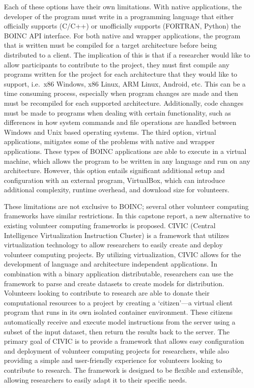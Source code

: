 \documentclass[11pt]{article}
\begin{document}
Each of these options have their own limitations. With native applications, the developer of the program must write in a programming language that either officially supports (C/C++) or unofficially supports (FORTRAN, Python) the BOINC API interface. For both native and wrapper applications, the program that is written must be compiled for a target architecture before being distributed to a client. The implication of this is that if a researcher would like to allow participants to contribute to the project, they must first compile any programs written for the project for each architecture that they would like to support, i.e.\ x86 Windows, x86 Linux, ARM Linux, Android, etc. This can be a time consuming process, especially when program changes are made and then must be recompiled for each supported architecture. Additionally, code changes must be made to programs when dealing with certain functionality, such as differences in how system commands and file operations are handled between Windows and Unix based operating systems. The third option, virtual applications, mitigates some of the problems with native and wrapper applications. These types of BOINC applications are able to execute in a virtual machine, which allows the program to be written in any language and run on any architecture. However, this option entails significant additional setup and configuration with an external program, VirtualBox, which can introduce additional complexity, runtime overhead, and download size for volunteers.

These limitations are not exclusive to BOINC; several other volunteer computing frameworks have similar restrictions. In this capstone report, a new alternative to existing volunteer computing frameworks is proposed. CIVIC (Central Intelligence Virtualization Instruction Cluster) is a framework that utilizes virtualization technology to allow researchers to easily create and deploy volunteer computing projects. By utilizing virtualization, CIVIC allows for the development of language and architecture independent applications. In combination with a binary application distributable, researchers can use the framework to parse and create datasets to create models for distribution. Volunteers looking to contribute to research are able to donate their computational resources to a project by creating a `citizen'---a virtual client program that runs in its own isolated container environment. These citizens automatically receive and execute model instructions from the server using a subset of the input dataset, then return the results back to the server. The primary goal of CIVIC is to provide a framework that allows easy configuration and deployment of volunteer computing projects for researchers, while also providing a simple and user-friendly experience for volunteers looking to contribute to research. The framework is designed to be flexible and extensible, allowing researchers to easily adapt it to their specific needs.
\end{document}
